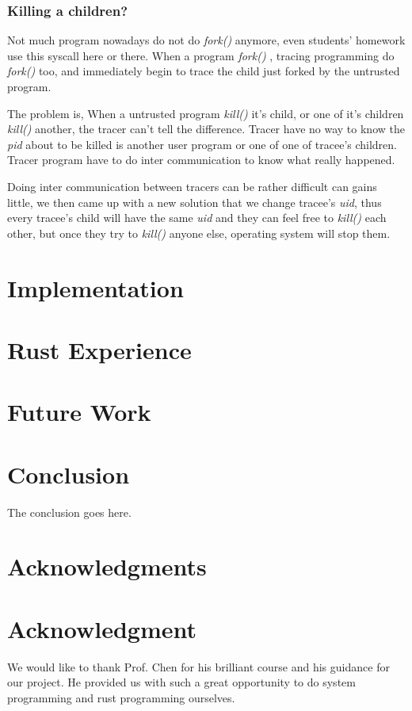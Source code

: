 \documentclass[conference,compsoc]{IEEEtran}
\begin{document}
		\subsubsection{Killing a children?}
		\par 
			Not much program nowadays do not do \emph{ fork() } anymore, even students' homework use this syscall here or there. When a program \emph{ fork() }, tracing programming do \emph{ fork() } too, and immediately begin to trace the child just forked by the untrusted program.
		\par
			The problem is, When a untrusted program \emph{kill()} it's child, or one of it's children \emph{kill()} another, the tracer can't tell the difference. Tracer have no way to know the \emph{pid} about to be killed is another user program or one of one of tracee's children. Tracer program have to do inter communication to know what really happened.
		\par
			Doing inter communication between tracers can be rather difficult can gains little, we then came up with a new solution that we change tracee's \emph{uid}, thus every tracee's child will have the same \emph{uid} and they can feel free to \emph{kill()} each other, but once they try to \emph{kill()} anyone else, operating system will stop them.


\section{Implementation}

\section{Rust Experience}

\section{Future Work}
\section{Conclusion}
	The conclusion goes here.\cite{SecSandBox}

\ifCLASSOPTIONcompsoc
	\section*{Acknowledgments}
\else
	\section*{Acknowledgment}
\fi
	We would like to thank Prof. Chen for his brilliant course and his guidance for our project. He provided us with such a great opportunity to do system programming and rust programming ourselves. 






\end{document}
